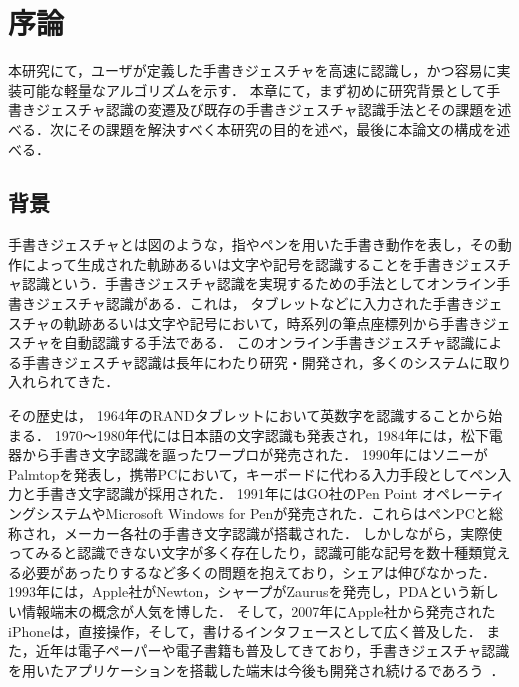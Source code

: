 \chapter{序論}
本研究にて，ユーザが定義した手書きジェスチャを高速に認識し，かつ容易に実装可能な軽量なアルゴリズムを示す．
本章にて，まず初めに研究背景として手書きジェスチャ認識の変遷及び既存の手書きジェスチャ認識手法とその課題を述べる．次にその課題を解決すべく本研究の目的を述べ，最後に本論文の構成を述べる．

\section{背景}
手書きジェスチャとは図のような，指やペンを用いた手書き動作を表し，その動作によって生成された軌跡あるいは文字や記号を認識することを手書きジェスチャ認識という．手書きジェスチャ認識を実現するための手法としてオンライン手書きジェスチャ認識がある．これは，
タブレットなどに入力された手書きジェスチャの軌跡あるいは文字や記号において，時系列の筆点座標列から手書きジェスチャを自動認識する手法である．
このオンライン手書きジェスチャ認識による手書きジェスチャ認識は長年にわたり研究・開発され，多くのシステムに取り入れられてきた．

その歴史は，
1964年のRANDタブレットにおいて英数字を認識することから始まる．
1970〜1980年代には日本語の文字認識も発表され，1984年には，松下電器から手書き文字認識を謳ったワープロが発売された．
1990年にはソニーがPalmtopを発表し，携帯PCにおいて，キーボードに代わる入力手段としてペン入力と手書き文字認識が採用された．
1991年にはGO社のPen Point オペレーティングシステムやMicrosoft Windows for Penが発売された．これらはペンPCと総称され，メーカー各社の手書き文字認識が搭載された．
しかしながら，実際使ってみると認識できない文字が多く存在したり，認識可能な記号を数十種類覚える必要があったりするなど多くの問題を抱えており，シェアは伸びなかった．
1993年には，Apple社がNewton，シャープがZaurusを発売し，PDAという新しい情報端末の概念が人気を博した．
そして，2007年にApple社から発売されたiPhoneは，直接操作，そして，書けるインタフェースとして広く普及した．
また，近年は電子ペーパーや電子書籍も普及してきており，手書きジェスチャ認識を用いたアプリケーションを搭載した端末は今後も開発され続けるであろう~\cite{110009437469}．

